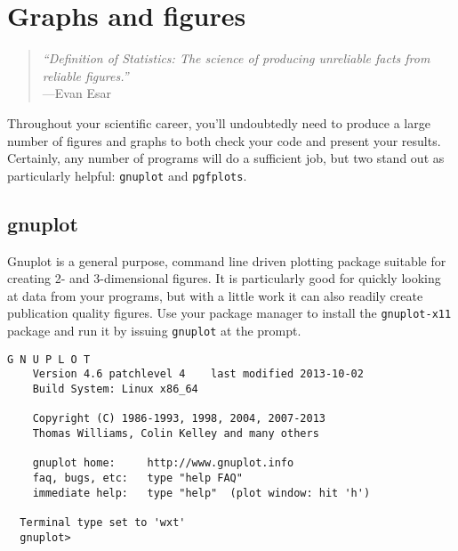\chapter{Graphs and figures}
\begin{quote}\small
  \emph{``Definition of Statistics: The science of producing unreliable facts from reliable figures.''} \\ \hspace*{\fill}---Evan Esar
\end{quote}

Throughout your scientific career, you'll undoubtedly need to produce a large number of figures and graphs to both check your code and present your results.
Certainly, any number of programs will do a sufficient job, but two stand out as particularly helpful: \texttt{gnuplot} and \texttt{pgfplots}.

\section{gnuplot}
Gnuplot is a general purpose, command line driven plotting package suitable for creating 2- and 3-dimensional figures.
It is particularly good for quickly looking at data from your programs, but with a little work it can also readily create publication quality figures.
Use your package manager to install the \texttt{gnuplot-x11} package and run it by issuing \texttt{gnuplot} at the prompt.
\begin{lstlisting}[style=prompt,nolol]
    G N U P L O T
    Version 4.6 patchlevel 4    last modified 2013-10-02 
    Build System: Linux x86_64

    Copyright (C) 1986-1993, 1998, 2004, 2007-2013
    Thomas Williams, Colin Kelley and many others

    gnuplot home:     http://www.gnuplot.info
    faq, bugs, etc:   type "help FAQ"
    immediate help:   type "help"  (plot window: hit 'h')

  Terminal type set to 'wxt'
  gnuplot> 
\end{lstlisting}

